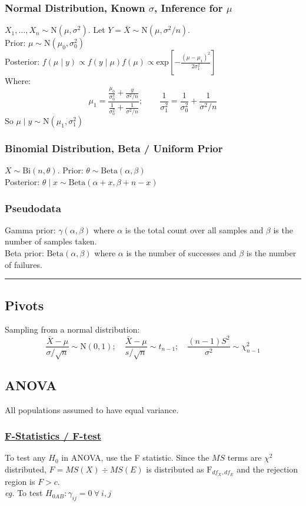 \documentclass{article}
\begin{document}
\begin{multicols*}{2}
\subsubsection*{Normal Distribution, Known $\sigma$, Inference for $\mu$}
$X_{1}, \dots, X_{n} \sim \mbox{N}(\mu, \sigma^{2})$. Let $Y = \bar{X} \sim \mbox{N}(\mu, \sigma^{2}/n)$.\\
Prior: $\mu \sim \mbox{N}(\mu_{0}, \sigma^{2}_{0})$\\
Posterior: $f(\mu \mid y) \propto f(y \mid \mu) f(\mu) \propto \mbox{exp}\left[ -\frac{(\mu - \mu_{1})^{2}}{2 \sigma^{2}_{1}} \right]$\\
Where:
$$\mu_{1} = \frac{\frac{\mu_{0}}{\sigma^{2}_{0}} + \frac{y}{\sigma^{2}/n}}{\frac{1}{\sigma^{2}_{0}} + \frac{1}{\sigma^{2}/n}}; \qquad \frac{1}{\sigma^{2}_{1}} = \frac{1}{\sigma^{2}_{0}} + \frac{1}{\sigma^{2} / n}$$
So $\mu \mid y \sim \mbox{N}(\mu_{1}, \sigma^{2}_{1})$
\subsubsection*{Binomial Distribution, Beta / Uniform Prior}
$X \sim \mbox{Bi}(n, \theta)$. Prior: $\theta \sim \mbox{Beta}(\alpha, \beta)$\\
Posterior: $\theta \mid x \sim \mbox{Beta}(\alpha + x, \beta + n - x)$
\subsubsection*{Pseudodata}
Gamma prior: $\gamma(\alpha, \beta)$ where $\alpha$ is the total count over all samples and $\beta$ is the number of samples taken.\\
Beta prior: $\mbox{Beta}(\alpha, \beta)$ where $\alpha$ is the number of successes and $\beta$ is the number of failures.

\noindent\rule{\linewidth}{0.25pt}
\subsection*{Pivots}
Sampling from a normal distribution:
$$\frac{\bar{X} - \mu}{\sigma / \sqrt{n}} \sim \mbox{N}(0, 1); \quad \frac{\bar{X} - \mu}{s / \sqrt{n}} \sim t_{n-1}; \quad \frac{(n-1)S^{2}}{\sigma^{2}} \sim \chi^{2}_{n-1}$$

\newpage
\subsection*{ANOVA}
All populations assumed to have equal variance.
\subsubsection*{\underline{F-Statistics / F-test}}
To test any $H_{0}$ in ANOVA, use the F statistic. Since the $MS$ terms are $\chi^{2}$ distributed, $F = MS(X) \div MS(E)$ is distributed as $\mbox{F}_{df_{X}, df_{E}}$ and the rejection region is $F > c$.\\
\textit{eg.} To test $H_{0AB}: \gamma_{ij} = 0\ \forall\ i, j$ 


\end{multicols*}
\end{document}
